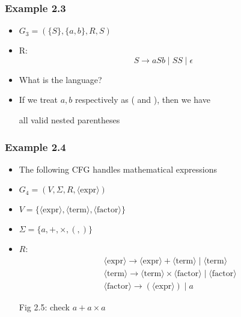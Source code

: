 \begin{frame}[allowframebreaks] \frametitle{Example 2.3}
  \begin{itemize}

\item $G_3
=(\{S\}, \{a,b\}, R, S)$

\item[]  R:
\begin{equation*}
  S \rightarrow aSb\mid SS \mid \epsilon
\end{equation*}
\item What is the language?
\item If we treat $a, b$ respectively as ( and ), then
  we have
  \begin{center}
all valid nested parentheses
\end{center}
\end{itemize}\end{frame} \begin{frame}[allowframebreaks] \frametitle{Example 2.4}
  \begin{itemize}
  \item The following CFG handles mathematical expressions
\item $G_4=
(V, \Sigma, R, \langle \text{expr}\rangle)$

\item [] $V=\{\langle \text{expr}\rangle,\langle \text{term}\rangle,\langle \text{factor}\rangle\}
$

\item [] $\Sigma=\{a,+,\times,(,)\}$
\item [] $R$:
\begin{eqnarray*}
&& \langle \text{expr}\rangle \rightarrow \langle \text{expr}\rangle+\langle \text{term}\rangle\mid\langle \text{term}\rangle\\
&& \langle \text{term}\rangle  \rightarrow \langle \text{term}\rangle\times\langle \text{factor}\rangle\mid 
\langle \text{factor}\rangle\\
&& \langle \text{factor}\rangle\rightarrow (\langle \text{expr}\rangle)\mid a
\end{eqnarray*}

Fig 2.5: check
$a+a\times a$

\framebreak



\end{itemize}
\end{frame}
